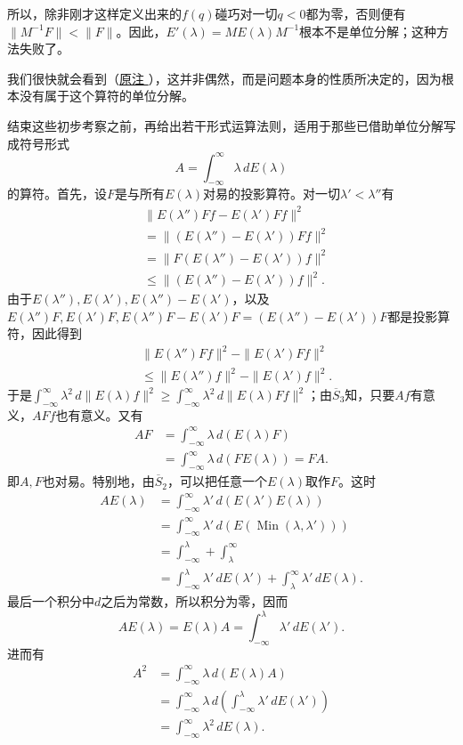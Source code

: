 \documentclass[fontsize=13pt,twoside,openany,headings=normal,parskip=false,bookmarkpackage=false,DIV=calc]{scrbook}
\begin{document}
\hypertarget{origpage-73}{}\label{origpage-73}所以，除非刚才这样定义出来的$f(q)$碰巧对一切$q<0$都为零，否则便有$\|M^{-1}F\|<\|F\|$。因此，$E'(\lambda)=ME(\lambda)M^{-1}$根本不是单位分解；这种方法失败了。

我们很快就会看到（\hyperlink{note-105}{原注 }），这并非偶然，而是问题本身的性质所决定的，因为根本没有属于这个算符的单位分解。

结束这些初步考察之前，再给出若干形式运算法则，适用于那些已借助单位分解写成符号形式
\[
A=\int_{-\infty}^{\infty}\lambda\,dE(\lambda)
\]
的算符。首先，设$F$是与所有$E(\lambda)$对易的投影算符。对一切$\lambda'<\lambda''$有
\begin{align*}
&\|E(\lambda'')Ff-E(\lambda')Ff\|^2\\
&=\|(E(\lambda'')-E(\lambda'))Ff\|^2\\
&=\|F(E(\lambda'')-E(\lambda'))f\|^2\\
&\leq\|(E(\lambda'')-E(\lambda'))f\|^2.
\end{align*}
由于$E(\lambda''),\allowbreak E(\lambda'),\allowbreak E(\lambda'')-E(\lambda')$，以及$E(\lambda'')F,\allowbreak E(\lambda')F,\allowbreak E(\lambda'')F-E(\lambda')F=(E(\lambda'')-E(\lambda'))F$都是投影算符，因此得到
\begin{align*}
&\|E(\lambda'')Ff\|^2-\|E(\lambda')Ff\|^2\\
&\leq\|E(\lambda'')f\|^2-\|E(\lambda')f\|^2.
\end{align*}
于是$\int_{-\infty}^{\infty}\lambda^2\,d\|E(\lambda)f\|^2\geq\int_{-\infty}^{\infty}\lambda^2\,d\|E(\lambda)Ff\|^2$；由$\hyperref[cond:II.Sbar3]{\overline{S}_3}$知，只要$Af$有意义，$AFf$也有意义。又有
\begin{align*}
AF&=\int_{-\infty}^{\infty}\lambda\,d(E(\lambda)F)\\
&=\int_{-\infty}^{\infty}\lambda\,d(FE(\lambda))=FA.
\end{align*}
即$A,\allowbreak F$也对易。特别地，由$\hyperref[cond:II.Sbar2]{\overline{S}_2}$，可以把任意一个$E(\lambda)$取作$F$。这时
\begin{align*}
AE(\lambda)&=\int_{-\infty}^{\infty}\lambda'\,d(E(\lambda')E(\lambda))\\
&=\int_{-\infty}^{\infty}\lambda'\,d(E(\operatorname{Min}(\lambda,\lambda')))\\
&=\int_{-\infty}^{\lambda}+\int_\lambda^{\infty}\\
&=\int_{-\infty}^{\lambda}\lambda'\,dE(\lambda')+\int_\lambda^{\infty}\lambda'\,dE(\lambda).
\end{align*}
最后一个积分中$d$之后为常数，所以积分为零，因而
\[
AE(\lambda)=E(\lambda)A=\int_{-\infty}^{\lambda}\lambda'\,dE(\lambda').
\]
进而有
\begin{align*}
A^2&=\int_{-\infty}^{\infty}\lambda\,d(E(\lambda)A)\\
&=\int_{-\infty}^{\infty}\lambda\,d\left(\int_{-\infty}^{\lambda}\lambda'\,dE(\lambda')\right)\\
&=\int_{-\infty}^{\infty}\lambda^2\,dE(\lambda).
\end{align*}
\end{document}
